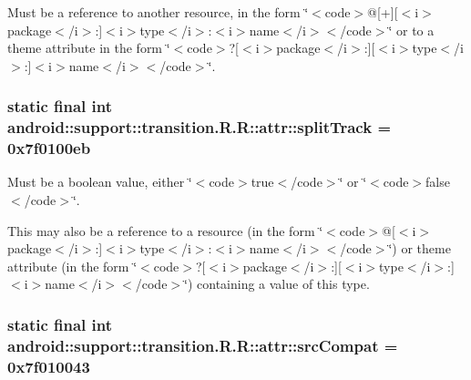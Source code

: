 Must be a reference to another resource, in the form \char`\"{}$<$code$>$@\mbox{[}+\mbox{]}\mbox{[}$<$i$>$package$<$/i$>$:\mbox{]}$<$i$>$type$<$/i$>$:$<$i$>$name$<$/i$>$$<$/code$>$\char`\"{} or to a theme attribute in the form \char`\"{}$<$code$>$?\mbox{[}$<$i$>$package$<$/i$>$:\mbox{]}\mbox{[}$<$i$>$type$<$/i$>$:\mbox{]}$<$i$>$name$<$/i$>$$<$/code$>$\char`\"{}. \hypertarget{classandroid_1_1support_1_1transition_1_1_r_1_1attr_9eed64a652cb1a7a5f5a060e51c1bad8}{
\subsubsection[{splitTrack}]{\setlength{\rightskip}{0pt plus 5cm}static final int android::support::transition.R.R::attr::splitTrack = 0x7f0100eb}}
\label{classandroid_1_1support_1_1transition_1_1_r_1_1attr_9eed64a652cb1a7a5f5a060e51c1bad8}


Must be a boolean value, either \char`\"{}$<$code$>$true$<$/code$>$\char`\"{} or \char`\"{}$<$code$>$false$<$/code$>$\char`\"{}. 

This may also be a reference to a resource (in the form \char`\"{}$<$code$>$@\mbox{[}$<$i$>$package$<$/i$>$:\mbox{]}$<$i$>$type$<$/i$>$:$<$i$>$name$<$/i$>$$<$/code$>$\char`\"{}) or theme attribute (in the form \char`\"{}$<$code$>$?\mbox{[}$<$i$>$package$<$/i$>$:\mbox{]}\mbox{[}$<$i$>$type$<$/i$>$:\mbox{]}$<$i$>$name$<$/i$>$$<$/code$>$\char`\"{}) containing a value of this type. \hypertarget{classandroid_1_1support_1_1transition_1_1_r_1_1attr_00977eeb0bee04e4450d85693f94e433}{
\subsubsection[{srcCompat}]{\setlength{\rightskip}{0pt plus 5cm}static final int android::support::transition.R.R::attr::srcCompat = 0x7f010043}}
\label{classandroid_1_1support_1_1transition_1_1_r_1_1attr_00977eeb0bee04e4450d85693f94e433}


